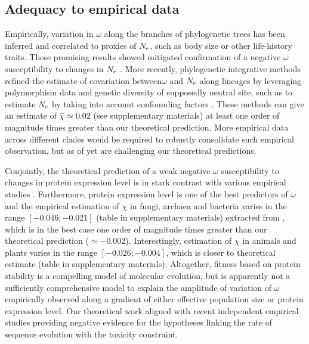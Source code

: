 \subsection{Adequacy to empirical data}
Empirically, variation in $\omega$ along the branches of phylogenetic trees has been inferred and correlated to proxies of $N_{\mathrm{e}}$, such as body size or other life-history traits.
These promising results showed mitigated confirmation of a negative $\omega$ susceptibility to changes in $N_{\mathrm{e}}$ \citep{Lanfear2014}.
More recently, phylogenetic integrative methods refined the estimate of covariation between$\omega$ and $N_{\mathrm{e}}$ along lineages by leveraging polymorphism data and genetic diversity of supposedly neutral site, such as to estimate $N_{\mathrm{e}}$ by taking into account confounding factors \citep{Brevet2019}.
These methods can give an estimate of $\hat{\chi} \simeq 0.02$ (see supplementary materials) at least one order of magnitude times greater than our theoretical prediction.
More empirical data across different clades would be required to robustly consolidate such empirical observation, but as of yet are challenging our theoretical predictions.

Conjointly, the theoretical prediction of a weak negative $\omega$ susceptibility to changes in protein expression level is in stark contrast with various empirical studies \citep{Duret2000, Rocha2004, Wang2011, Song2017}.
Furthermore, protein expression level is one of the best predictors of $\omega$ and the empirical estimation of $\chi$ in fungi, archaea and bacteria varies in the range $[-0.046;-0.021]$ (table in supplementary materials) extracted from  \citet{Zhang2015}, which is in the best case one order of magnitude times greater than our theoretical prediction ($\simeq -0.002$).
Interestingly, estimation of $\chi$ in animals and plants varies in the range $[-0.026;-0.004]$, which is closer to theoretical estimate (table in supplementary materials). Altogether, fitness based on protein stability is a compelling model of molecular evolution, but is apparently not a sufficiently comprehensive model to explain the amplitude of variation of $\omega$ empirically observed along a gradient of either effective population size or protein expression level.
Our theoretical work aligned with recent independent empirical studies providing negative evidence for the hypotheses linking the rate of sequence evolution with the toxicity constraint\citep{Plata2017,Razban2019,Biesiadecka2020}.

